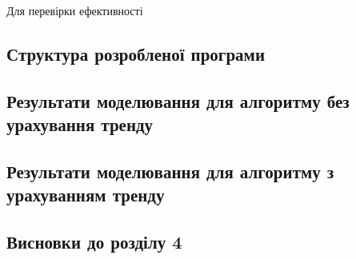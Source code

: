 \newpage
{}
    Для перевірки ефективності \TBD
\subsection{Структура розробленої програми}
    \TBD

\subsection{Результати моделювання для алгоритму без урахування тренду}
    \TBD
\subsection{Результати моделювання для алгоритму з урахуванням тренду}
    \TBD
\newpage
\subsection*{Висновки до розділу 4}
    \TBD
